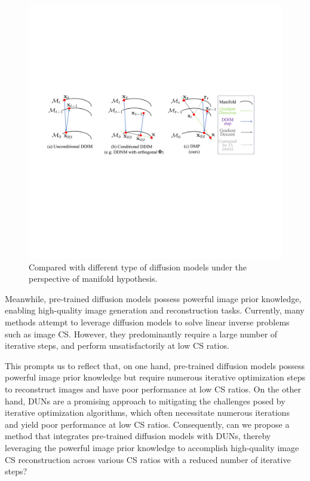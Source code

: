 \documentclass[10pt,twocolumn,letterpaper]{article}
\begin{document}
\begin{figure}[t]
	\centering
	\includegraphics[width=\linewidth]{Manifold.pdf}
	\caption{Compared with different type of diffusion models under the perspective of manifold hypothesis.}
	\label{fig:manifold}
\end{figure}

Meanwhile, pre-trained diffusion models\cite{DBLP:conf/nips/HoJA20, DBLP:conf/iclr/SongME21} possess powerful image prior knowledge, enabling high-quality image generation and reconstruction tasks. Currently, many methods\cite{DBLP:conf/nips/KawarEES22, wang2022zero, DBLP:conf/nips/ChungSRY22, he2024manifold, DBLP:conf/iclr/SongVMK23, DBLP:conf/iclr/ChungKMKY23, DBLP:conf/cvpr/FeiLPZYLZ023, DBLP:conf/nips/RoutRDCDS23, DBLP:journals/pami/SahariaHCSFN23} attempt to leverage diffusion models to solve linear inverse problems such as image CS. However, they predominantly require a large number of iterative steps, and perform unsatisfactorily at low CS ratios.

This prompts us to reflect that, on one hand, pre-trained diffusion models possess powerful image prior knowledge but require numerous iterative optimization steps to reconstruct images and have poor performance at low CS ratios. On the other hand, DUNs are a promising approach to mitigating the challenges posed by iterative optimization algorithms, which often necessitate numerous iterations and yield poor performance at low CS ratios. Consequently, can we propose a method that integrates pre-trained diffusion models with DUNs, thereby leveraging the powerful image prior knowledge to accomplish high-quality image CS reconstruction across various CS ratios with a reduced number of iterative steps?
\end{document}
